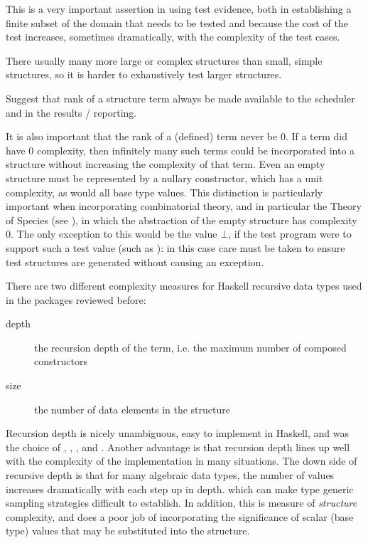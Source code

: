This is a very important assertion in using test evidence,
both in establishing a finite subset of the domain that needs to be tested
and because the cost of the test increases,
sometimes dramatically, with the complexity of the test cases.

There usually many more large or complex structures than small, simple structures,
so it is harder to exhaustively test larger structures.

Suggest that rank of a structure term always be made available to the scheduler
and in the results / reporting.

It is also important that the rank of a (defined) term never be $0$.
If a term did have $0$ complexity,
then infinitely many such terms could be incorporated into a structure
without increasing the complexity of that term.
Even an empty structure must be represented by a nullary constructor,
which has a unit complexity, as would all base type values.
This distinction is particularly important when incorporating combinatorial theory, 
and in particular the Theory of Species (see \cite{Joyal81}),
in which the abstraction of the empty structure has complexity $0$.
The only exception to this would be the value $\bot$,
if the test program were to support such a test value (such as \LSC):
in this case care must be taken to ensure test structures are generated without causing an exception.


There are two different complexity measures for Haskell recursive data types
used in the packages reviewed before:

\begin{description}
\item[depth] the recursion depth of the term, i.e. the maximum number of composed constructors
\item[size] the number of data elements in the structure
\end{description}

Recursion depth is nicely unambiguous, easy to implement in Haskell,
and was the choice of \QC, \SC, \EC, \GAST and \DAISTS.
Another advantage is that recursion depth lines up well 
with the complexity of the implementation in many situations.
The down side of recursive depth is that 
for many algebraic data types, 
the number of values increases dramatically with each step up in depth.
which can make type generic sampling strategies difficult to establish.
In addition, this is measure of \emph{structure} complexity, 
and does a poor job of incorporating the significance of 
scalar (base type) values that may be substituted into the structure.

